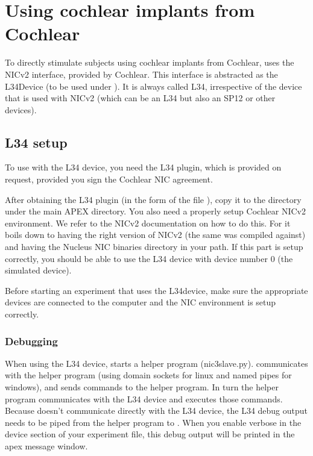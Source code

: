 \chapter{Using cochlear implants from Cochlear}
\label{sec:L34}

To directly stimulate subjects using cochlear implants from Cochlear, \apex uses the NICv2 interface, provided by Cochlear.
This interface is abstracted as the L34Device (to be used under ).
It is always called L34, irrespective of the device that is used
with NICv2 (which can be an L34 but also an SP12 or other devices).

\section{L34 setup}

To use \apex with the L34 device, you need the L34 plugin, which is provided on request, provided you sign the Cochlear NIC agreement.

After obtaining the L34 plugin (in the form of the file ), copy it to the  directory under the main APEX directory.
You also need a properly setup Cochlear NICv2 environment. We refer to the NICv2
documentation on how to do this. For \apex it boils down to having
the right version of NICv2 (the same \apex was compiled against)
and having the Nucleus NIC binaries directory in your path. If
this part is setup correctly, you should be able to use the L34
device with device number 0 (the simulated device).

Before starting an \apex experiment that uses the L34device, make sure the appropriate devices are connected to the computer and the NIC environment is setup correctly.

\subsection{Debugging}

When using the L34 device, \apex starts a helper program (nic3slave.py). \apex
communicates with the helper program (using domain sockets for linux and named
pipes for windows), and sends commands to the helper program. In turn the
helper program communicates with the L34 device and executes those commands.
Because \apex doesn't communicate directly with the L34 device, the L34 debug
output needs to be piped from the helper program to \apex. When you enable
verbose in the device section of your experiment file, this debug output will
be printed in the apex message window.\\

